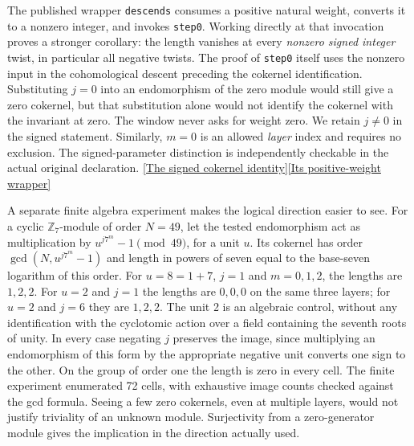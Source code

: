 \documentclass[12pt,letterpaper]{article}
\begin{document}
The published wrapper \texttt{descends} consumes a positive natural weight, converts it to a nonzero integer, and invokes \texttt{step0}. Working directly at that invocation proves a stronger corollary: the length vanishes at every \emph{nonzero signed integer} twist, in particular all negative twists. The proof of \texttt{step0} itself uses the nonzero input in the cohomological descent preceding the cokernel identification. Substituting \(j=0\) into an endomorphism of the zero module would still give a zero cokernel, but that substitution alone would not identify the cokernel with the invariant at zero. The window never asks for weight zero. We retain \(j\ne0\) in the signed statement. Similarly, \(m=0\) is an allowed \emph{layer} index and requires no exclusion. The signed-parameter distinction is independently checkable in the actual original declaration. \href{https://github.com/nousentllc/riemann-hypothesis/blob/40e56bab026552e089d7afcfeff08d2defb9c005/src/Development/AutomorphicArithmetic/AutomorphicVarieties/NumberFieldTowers/ExistsDescends.lean#L26-L46}{[The signed cokernel identity]}\quad\href{https://github.com/nousentllc/riemann-hypothesis/blob/40e56bab026552e089d7afcfeff08d2defb9c005/src/Development/AutomorphicArithmetic/AutomorphicVarieties/AdditiveValuationNorms/Descends.lean#L8-L15}{[Its positive-weight wrapper]}

A separate finite algebra experiment makes the logical direction easier to see. For a cyclic \(\mathbb Z_7\)-module of order \(N=49\), let the tested endomorphism act as multiplication by \(u^{j7^m}-1\pmod {49}\), for a unit \(u\). Its cokernel has order \(\gcd(N,u^{j7^m}-1)\) and length in powers of seven equal to the base-seven logarithm of this order. For \(u=8=1+7\), \(j=1\) and \(m=0,1,2\), the lengths are \(1,2,2\). For \(u=2\) and \(j=1\) the lengths are \(0,0,0\) on the same three layers; for \(u=2\) and \(j=6\) they are \(1,2,2\). The unit 2 is an algebraic control, without any identification with the cyclotomic action over a field containing the seventh roots of unity. In every case negating \(j\) preserves the image, since multiplying an endomorphism of this form by the appropriate negative unit converts one sign to the other. On the group of order one the length is zero in every cell. The finite experiment enumerated 72 cells, with exhaustive image counts checked against the gcd formula. Seeing a few zero cokernels, even at multiple layers, would not justify triviality of an unknown module. Surjectivity from a zero-generator module gives the implication in the direction actually used.
\end{document}
